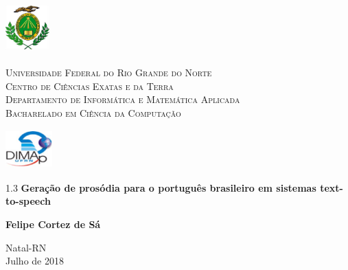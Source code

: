 \begin{titlepage}
	\begin{center}
		
		\begin{minipage}{2cm}
			\begin{center}
				\includegraphics[width=1.7cm, height=2.0cm]{Imagens/Brasao-UFRN.jpg}
			\end{center}
		\end{minipage}
		\begin{minipage}{11cm}
			\begin{center}
				\begin{espacosimples}
					{\small \textsc{Universidade Federal do Rio Grande do Norte}			\\
							  \textsc{Centro de Ciências Exatas e da Terra}						\\
							  \textsc{Departamento de Informática e Matemática Aplicada}	\\
							  \textsc{Bacharelado em Ciência da Computação}}
				\end{espacosimples}
			\end{center}
		\end{minipage}
		\begin{minipage}{2cm}
			\begin{center}
				\includegraphics[width=1.8cm, height=1.5cm]{Imagens/Logotipo-DIMAp.jpg}
			\end{center}
		\end{minipage}
			
		\vspace{6cm}
						
		{\setlength{\baselineskip}%
		{1.3\baselineskip}
		{\LARGE \textbf{Geração de prosódia para o português brasileiro em sistemas text-to-speech}}\par}
			
		\vspace{4cm}
			
		{\large \textbf{Felipe Cortez de Sá}}
						
		\vspace{7cm}
		
		Natal-RN\\Julho de 2018
	\end{center}
\end{titlepage}
